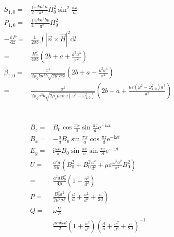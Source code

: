 \documentclass[10pt,fleqn]{article}
\newcommand{\ud}{\mathrm{d}}
\newcommand{\ue}{\mathrm{e}}
\newcommand{\ui}{\mathrm{i}}
\newcommand{\eqar}[1]
{
  \begin{align*}
    #1
  \end{align*}
}
\newcommand{\paren}[1]{{\left({#1}\right)}}
\newcommand{\abs}[1]{{\left|{#1}\right|}}
\newcommand{\diff}[3][{}]{{\frac{\ud^{#1} {#2}}{\ud {#3}{}^{#1}}}}
\begin{document}
\section{}
\eqar{
  S_{1,0}=&\frac12\frac{\omega ka^2\mu}{\pi^2}H_0^2\sin^2\frac{\pi x}{a}\\
  P_{1,0}=&\frac14\frac{\omega ka^3b\mu}{\pi^2}H_0^2\\
  -\diff{P}{z}=&\frac{1}{2\sigma\delta}\int\abs{\vec n\times\vec H}^2\ud l\\
  =&\frac{H_0^2}{4\sigma\delta}\paren{2b+a+\frac{k^2a^3}{\pi^2}}\\
  \beta_{1,0}=&\frac{\pi^2}{2\mu_0ka^3b\sqrt{2\mu_c\sigma\omega}}\paren{2b+a+\frac{k^2a^3}{\pi^2}}\\
  =&\frac{\pi^2}{2\mu_0a^3b\sqrt{2\mu_c\mu\varepsilon\sigma\omega\paren{\omega^2-\omega_{1,0}^2}}}\paren{2b+a+\frac{\mu\varepsilon\paren{\omega^2-\omega_{1,0}^2}a^3}{\pi^2}}
}

\section{}
\eqar{
  B_z=&B_0\cos\frac{\pi x}{a}\sin\frac{\pi z}{d}\ue^{-\ui\omega t}\\
  B_x=&-\frac{a}{d}B_0\sin\frac{\pi x}{a}\cos\frac{\pi z}{d}\ue^{-\ui\omega t}\\
  E_y=&\ui\frac{\omega a}{\pi}B_0\sin\frac{\pi x}{a}\sin\frac{\pi z}{d}\ue^{-\ui\omega t}\\
  U=&\frac{a^2d}{8\mu}\paren{B_0^2+B_0^2\frac{a^2}{d^2}+\mu\varepsilon\frac{\omega^2a^2}{\pi^2}B_0^2}\\
  =&\frac{a^2dB_0^2}{4\mu}\paren{1+\frac{a^2}{d^2}}\\
  P=&\frac{B_0^2a^2}{2\mu^2\sigma\delta}\paren{\frac{d}{a}
    +\frac{a^2}{d^2}+\frac{a}{2d}}\\
  Q=&\omega\frac{U}{P}\\
  =&\frac{\mu\sigma\delta\omega d}{2}
  \paren{1+\frac{a^2}{d^2}}\paren{\frac{d}{a}+\frac{a^2}{d^2}+\frac{a}{2d}}^{-1}
}
\end{document}

